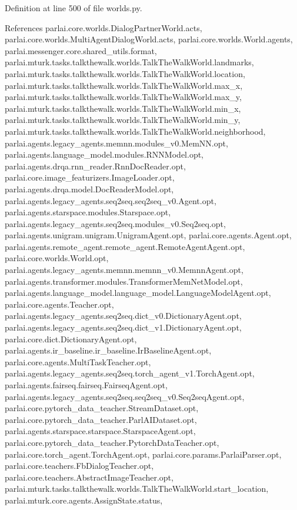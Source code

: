 Definition at line 500 of file worlds.\+py.



References parlai.\+core.\+worlds.\+Dialog\+Partner\+World.\+acts, parlai.\+core.\+worlds.\+Multi\+Agent\+Dialog\+World.\+acts, parlai.\+core.\+worlds.\+World.\+agents, parlai.\+messenger.\+core.\+shared\+\_\+utils.\+format, parlai.\+mturk.\+tasks.\+talkthewalk.\+worlds.\+Talk\+The\+Walk\+World.\+landmarks, parlai.\+mturk.\+tasks.\+talkthewalk.\+worlds.\+Talk\+The\+Walk\+World.\+location, parlai.\+mturk.\+tasks.\+talkthewalk.\+worlds.\+Talk\+The\+Walk\+World.\+max\+\_\+x, parlai.\+mturk.\+tasks.\+talkthewalk.\+worlds.\+Talk\+The\+Walk\+World.\+max\+\_\+y, parlai.\+mturk.\+tasks.\+talkthewalk.\+worlds.\+Talk\+The\+Walk\+World.\+min\+\_\+x, parlai.\+mturk.\+tasks.\+talkthewalk.\+worlds.\+Talk\+The\+Walk\+World.\+min\+\_\+y, parlai.\+mturk.\+tasks.\+talkthewalk.\+worlds.\+Talk\+The\+Walk\+World.\+neighborhood, parlai.\+agents.\+legacy\+\_\+agents.\+memnn.\+modules\+\_\+v0.\+Mem\+N\+N.\+opt, parlai.\+agents.\+language\+\_\+model.\+modules.\+R\+N\+N\+Model.\+opt, parlai.\+agents.\+drqa.\+rnn\+\_\+reader.\+Rnn\+Doc\+Reader.\+opt, parlai.\+core.\+image\+\_\+featurizers.\+Image\+Loader.\+opt, parlai.\+agents.\+drqa.\+model.\+Doc\+Reader\+Model.\+opt, parlai.\+agents.\+legacy\+\_\+agents.\+seq2seq.\+seq2seq\+\_\+v0.\+Agent.\+opt, parlai.\+agents.\+starspace.\+modules.\+Starspace.\+opt, parlai.\+agents.\+legacy\+\_\+agents.\+seq2seq.\+modules\+\_\+v0.\+Seq2seq.\+opt, parlai.\+agents.\+unigram.\+unigram.\+Unigram\+Agent.\+opt, parlai.\+core.\+agents.\+Agent.\+opt, parlai.\+agents.\+remote\+\_\+agent.\+remote\+\_\+agent.\+Remote\+Agent\+Agent.\+opt, parlai.\+core.\+worlds.\+World.\+opt, parlai.\+agents.\+legacy\+\_\+agents.\+memnn.\+memnn\+\_\+v0.\+Memnn\+Agent.\+opt, parlai.\+agents.\+transformer.\+modules.\+Transformer\+Mem\+Net\+Model.\+opt, parlai.\+agents.\+language\+\_\+model.\+language\+\_\+model.\+Language\+Model\+Agent.\+opt, parlai.\+core.\+agents.\+Teacher.\+opt, parlai.\+agents.\+legacy\+\_\+agents.\+seq2seq.\+dict\+\_\+v0.\+Dictionary\+Agent.\+opt, parlai.\+agents.\+legacy\+\_\+agents.\+seq2seq.\+dict\+\_\+v1.\+Dictionary\+Agent.\+opt, parlai.\+core.\+dict.\+Dictionary\+Agent.\+opt, parlai.\+agents.\+ir\+\_\+baseline.\+ir\+\_\+baseline.\+Ir\+Baseline\+Agent.\+opt, parlai.\+core.\+agents.\+Multi\+Task\+Teacher.\+opt, parlai.\+agents.\+legacy\+\_\+agents.\+seq2seq.\+torch\+\_\+agent\+\_\+v1.\+Torch\+Agent.\+opt, parlai.\+agents.\+fairseq.\+fairseq.\+Fairseq\+Agent.\+opt, parlai.\+agents.\+legacy\+\_\+agents.\+seq2seq.\+seq2seq\+\_\+v0.\+Seq2seq\+Agent.\+opt, parlai.\+core.\+pytorch\+\_\+data\+\_\+teacher.\+Stream\+Dataset.\+opt, parlai.\+core.\+pytorch\+\_\+data\+\_\+teacher.\+Parl\+A\+I\+Dataset.\+opt, parlai.\+agents.\+starspace.\+starspace.\+Starspace\+Agent.\+opt, parlai.\+core.\+pytorch\+\_\+data\+\_\+teacher.\+Pytorch\+Data\+Teacher.\+opt, parlai.\+core.\+torch\+\_\+agent.\+Torch\+Agent.\+opt, parlai.\+core.\+params.\+Parlai\+Parser.\+opt, parlai.\+core.\+teachers.\+Fb\+Dialog\+Teacher.\+opt, parlai.\+core.\+teachers.\+Abstract\+Image\+Teacher.\+opt, parlai.\+mturk.\+tasks.\+talkthewalk.\+worlds.\+Talk\+The\+Walk\+World.\+start\+\_\+location, parlai.\+mturk.\+core.\+agents.\+Assign\+State.\+status, 